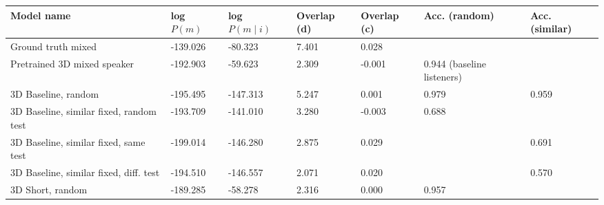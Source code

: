 \begin{table}[] 
	\begin{tabularx}{\textwidth}{|X|l|l|X|X|X|X|}
		\hline
		\textbf{Model name}                                    & \textbf{log $P(m)$} & \textbf{log $P(m \mid i)$} & \textbf{Overlap (d)} & \textbf{Overlap (c)} & \textbf{Acc. (random)} & \textbf{Acc. (similar)} \\ \hline
		Ground truth mixed       &     -139.026            &    -80.323             &       7.401        &        0.028        &                 &                \\ \hline
		Pretrained 3D mixed speaker    &      -192.903           &         -59.623               &        2.309              &      -0.001                & 0.944 (baseline listeners)                 &                 \\ \hline
		3D Baseline, random  &       -195.495        &           -147.313           &          5.247            &         0.001             & 0.979                                    &                        0.959                   \\ \hline
		3D Baseline, similar fixed, random test &       -193.709            &    -141.010                  &        3.280            &      -0.003         &            0.688       &                           \\ \hline
		3D Baseline, similar fixed, same test &      -199.014        &        -146.280           &        2.875       &      0.029   &              &          0.691                   \\ \hline
		3D Baseline, similar fixed, diff. test &     -194.510     &    -146.557          &   2.071      & 0.020    &                &              0.570          \\ \hline
		3D Short, random&      -189.285             &      -58.278                  &             2.316        &         0.000             &                   0.957                       &                                           \\ \hline

\end{tabularx}
\end{table}
